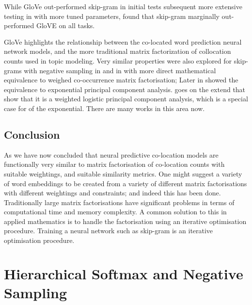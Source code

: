 \documentclass[parskip]{komatufte}
\begin{document}
While GloVe out-performed  skip-gram in initial tests subsequent more extensive testing in  with more tuned parameters,
found that skip-gram marginally out-performed GloVE on all tasks.





GloVe highlights the relationship between the co-located word prediction neural network models,
and the more traditional matrix factorization of collocation counts used in topic modeling.
Very similar properties were also explored for skip-grams with negative sampling in  and in  with more direct mathematical equivalence to weighed co-occurrence matrix factorisation;
Later in  showed the equivalence to exponential principal component analysis.
 goes on the extend that show that it is a weighted logistic principal component analysis, which is a special case for of the exponential.
There are many works in this area now.


\subsection{Conclusion}
As we have now concluded that neural predictive co-location models are functionally very similar to matrix factorisation of co-location counts with suitable weightings, and suitable similarity metrics.
One might suggest a variety of word embeddings to be created from a variety of different matrix factorisations with different weightings and constraints; and indeed this has been done.
Traditionally large matrix factorisations have significant problems in terms of computational time and memory complexity.
A common solution to this in applied mathematics is to handle the factorisation using an iterative optimisation procedure.
Training a neural network such as skip-gram is an iterative optimisation procedure.




\section{Hierarchical Softmax and Negative Sampling}\label{sec:hierachical-softmax-and-negative-sampling}
\end{document}
